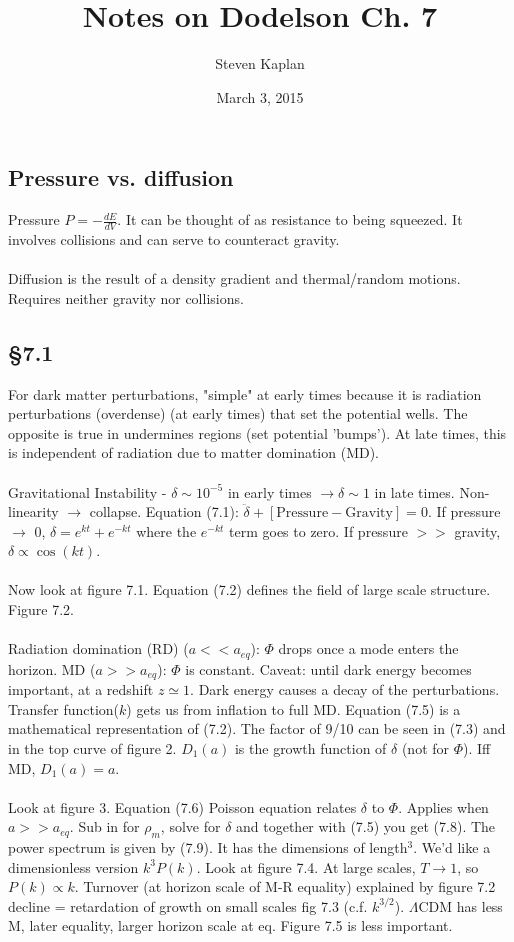 \documentclass[12pt]{article}
\title{Notes on Dodelson Ch. 7}
\author{Steven Kaplan}
\date{March 3, 2015}
\begin{document}
\maketitle
\subsection*{Pressure vs. diffusion}
Pressure $P=-\frac{dE}{dV}$.  It can be thought of as resistance to being squeezed.  It involves collisions and can serve to counteract gravity.
\\ \\
Diffusion is the result of a density gradient and thermal/random motions.  Requires neither gravity nor collisions.
\subsection*{\S 7.1}
For dark matter perturbations, "simple" at early times because it is radiation perturbations (overdense) (at early times) that set the potential wells.  The opposite is true in undermines regions (set potential 'bumps').  At late times, this is independent of radiation due to matter domination (MD).
\\ \\
Gravitational Instability - $\delta\sim10^{-5}$ in early times $\longrightarrow \delta\sim 1 $ in late times.  Non-linearity $\rightarrow$ collapse.  Equation (7.1): $\ddot{\delta}+[\mathrm{Pressure}-\mathrm{Gravity}]=0$.  If pressure $\rightarrow$ 0, $\delta=e^{kt}+e^{-kt}$ where the $e^{-kt}$ term goes to zero.  If pressure $>>$ gravity, $\delta \propto \cos(kt)$.  
\\ \\
Now look at figure 7.1.  Equation (7.2) defines the field of large scale structure.  Figure 7.2.
\\ \\
Radiation domination (RD) ($a<<a_{eq}$): $\Phi$ drops once a mode enters the horizon.  MD ($a >>a_{eq}$): $\Phi$ is constant.  Caveat: until dark energy becomes important, at a redshift $z\simeq 1$.  Dark energy causes a decay of the perturbations.  Transfer function($k$) gets us from inflation to full MD.  Equation (7.5) is a mathematical representation of (7.2).  The factor of 9/10 can be seen in (7.3) and in the top curve of figure 2.  $D_1(a)$ is the growth function of $\delta$ (not for $\Phi$).  Iff MD, $D_1(a)=a$.  
\\ \\
Look at figure 3.  Equation (7.6) Poisson equation relates $\delta$ to $\Phi$.  Applies when $a>>a_{eq}$.  Sub in for $\rho_m$, solve for $\delta$ and together with (7.5) you get (7.8).  The power spectrum is given by (7.9).  It has the dimensions of length$^3$.  We'd like a dimensionless version $k^3P(k)$.  Look at figure 7.4.  At large scales, $T\rightarrow 1$, so $P(k)\propto k$.  Turnover (at horizon scale of M-R equality) explained by figure 7.2 decline = retardation of growth on small scales fig 7.3 (c.f. $k^{3/2}$).  $\Lambda$CDM has less M, later equality, larger horizon scale at eq.  Figure 7.5 is less important.
\\ \\
\end{document}
